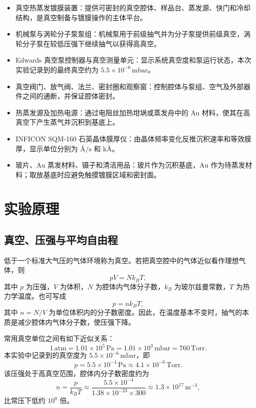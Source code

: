\documentclass[11pt]{article}
\newcommand{\Ang}{\text{\AA}}
\begin{document}
\begin{itemize}
    \item 真空热蒸发镀膜装置：提供可密封的真空腔体、样品台、蒸发源、快门和冷却结构，是真空制备与镀膜操作的主体平台。
    \item 机械泵与涡轮分子泵泵组：机械泵用于前级抽气并为分子泵提供前级真空，涡轮分子泵在较低压强下继续抽气以获得高真空。
    \item Edwards 真空泵控制器与真空测量单元：显示系统真空度和泵运行状态，本次实验记录到的最终真空约为 $5.5\times10^{-6}\,\mathrm{mbar}$。
    \item 真空阀门、放气阀、法兰、密封圈和观察窗：控制腔体与泵组、空气及外部器件之间的通断，并保证腔体密封。
    \item 热蒸发源及加热电源：通过电阻丝加热坩埚或蒸发舟中的 Au 材料，使其在高真空下产生蒸气并沉积到基底上。
    \item INFICON SQM-160 石英晶体膜厚仪：由晶体频率变化反推沉积速率和等效膜厚，显示单位分别为 $\Ang/\mathrm{s}$ 和 $\mathrm{k}\Ang$。
    \item 玻片、Au 蒸发材料、镊子和清洁用品：玻片作为沉积基底，Au 作为待蒸发材料；取放基底时应避免触摸镀膜区域和密封面。
\end{itemize}

\section{实验原理}

\subsection{真空、压强与平均自由程}

低于一个标准大气压的气体环境称为真空。若把真空腔中的气体近似看作理想气体，则
\begin{equation}
    pV = N k_B T,
    \label{eq:ideal_gas}
\end{equation}
其中 $p$ 为压强，$V$ 为体积，$N$ 为腔体内气体分子数，$k_B$ 为玻尔兹曼常数，$T$ 为热力学温度。也可写成
\begin{equation}
    p = n k_B T,
    \label{eq:number_density}
\end{equation}
其中 $n=N/V$ 为单位体积内的分子数密度。因此，在温度基本不变时，抽气的本质是减少腔体内气体分子数，使压强下降。

常用真空单位之间有如下近似关系：
\begin{equation}
    1\,\mathrm{atm}=1.01\times10^5\,\mathrm{Pa}
    =1.01\times10^3\,\mathrm{mbar}=760\,\mathrm{Torr}.
\end{equation}
本实验中记录到的真空度为 $5.5\times10^{-6}\,\mathrm{mbar}$，即
\begin{equation}
    p = 5.5\times10^{-4}\,\mathrm{Pa}
    \approx 4.1\times10^{-6}\,\mathrm{Torr}.
\end{equation}
该压强处于高真空范围，腔体内分子数密度约为
\begin{equation}
    n=\frac{p}{k_B T}
    \approx \frac{5.5\times10^{-4}}{1.38\times10^{-23}\times300}
    \approx 1.3\times10^{17}\,\mathrm{m^{-3}},
\end{equation}
比常压下低约 $10^8$ 倍。
\end{document}
